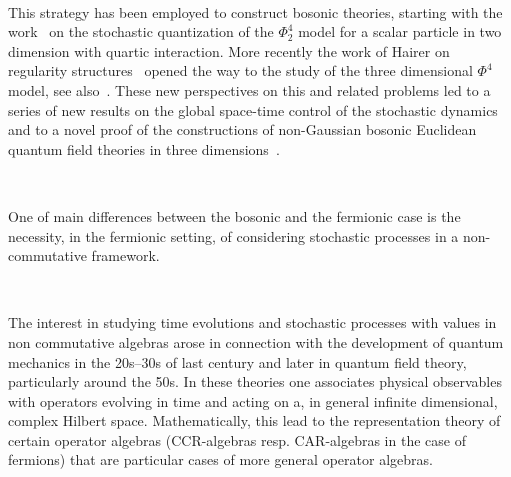 \documentclass{article}
\begin{document}
\

This strategy has been employed to construct bosonic theories, starting with
the work~{\cite{jona_lasinio_stochastic_1985}} on the stochastic quantization
of the $\Phi^4_2$ model for a scalar particle in two dimension with quartic
interaction. More recently the work of Hairer on regularity
structures~{\cite{hairer_theory_2014}} opened the way to the study of the
three dimensional $\Phi^4$ model, see
also~{\cite{catellier_paracontrolled_2013,kupiainen_renormalization_2016}}.
These new perspectives on this and related problems led to a series of new
results on the global space-time control of the stochastic
dynamics~{\cite{MWcomedown,gubinelli_global_2019,albeverio_invariant_2017,moinat_space_time_2018}}
and to a novel proof of the constructions of non-Gaussian bosonic Euclidean
quantum field theories in three dimensions~{\cite{gubinelli_pde_2018}}.

\

One of main differences between the bosonic and the fermionic case is the
necessity, in the fermionic setting, of considering stochastic processes in a
non-commutative framework.

\

The interest in studying time evolutions and stochastic processes with values
in non commutative algebras arose in connection with the development of
quantum mechanics in the 20s--30s of last century and later in quantum field
theory, particularly around the 50s. In these theories one associates physical
observables with operators evolving in time and acting on a, in general
infinite dimensional, complex Hilbert space. Mathematically, this lead to the
representation theory of certain operator algebras (CCR-algebras resp.
CAR-algebras in the case of fermions) that are particular cases of more
general operator algebras.

\
\end{document}
